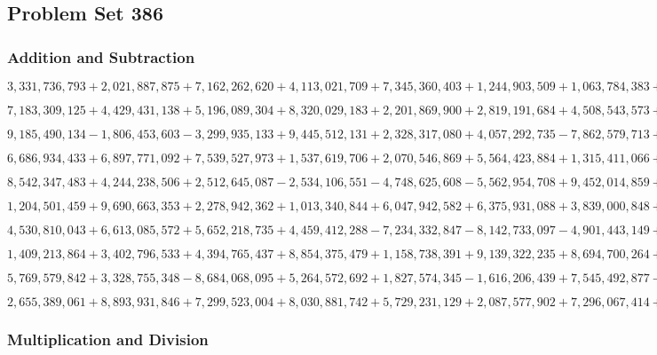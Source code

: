 \hypertarget{problem-set-386}{%
\subsection{Problem Set 386}\label{problem-set-386}}

\hypertarget{addition-and-subtraction}{%
\subsubsection{Addition and
Subtraction}\label{addition-and-subtraction}}

\(3,331,736,793+2,021,887,875+7,162,262,620+4,113,021,709+7,345,360,403+1,244,903,509+1,063,784,383+1,758,860,159+3,834,538,162+9,313,870,804\)

\(7,183,309,125+4,429,431,138+5,196,089,304+8,320,029,183+2,201,869,900+2,819,191,684+4,508,543,573+3,311,459,418+8,317,418,409+1,508,956,166\)

\(9,185,490,134-1,806,453,603-3,299,935,133+9,445,512,131+2,328,317,080+4,057,292,735-7,862,579,713+5,233,473,546-9,817,872,498+6,486,133,917\)

\(6,686,934,433+6,897,771,092+7,539,527,973+1,537,619,706+2,070,546,869+5,564,423,884+1,315,411,066+1,309,236,473+7,487,988,075+3,415,832,471\)

\(8,542,347,483+4,244,238,506+2,512,645,087-2,534,106,551-4,748,625,608-5,562,954,708+9,452,014,859+2,597,101,750+7,622,807,636-5,064,827,252\)

\(1,204,501,459+9,690,663,353+2,278,942,362+1,013,340,844+6,047,942,582+6,375,931,088+3,839,000,848+7,437,264,707+3,150,091,638+6,457,495,442\)

\(4,530,810,043+6,613,085,572+5,652,218,735+4,459,412,288-7,234,332,847-8,142,733,097-4,901,443,149+6,834,464,106+8,208,292,579-5,421,427,099\)

\(1,409,213,864+3,402,796,533+4,394,765,437+8,854,375,479+1,158,738,391+9,139,322,235+8,694,700,264+7,927,816,331+4,275,081,250+9,042,328,943\)

\(5,769,579,842+3,328,755,348-8,684,068,095+5,264,572,692+1,827,574,345-1,616,206,439+7,545,492,877-4,700,157,282+9,461,278,886-9,070,910,969\)

\(2,655,389,061+8,893,931,846+7,299,523,004+8,030,881,742+5,729,231,129+2,087,577,902+7,296,067,414+5,534,394,584+8,191,667,786+2,364,808,771\)

\hypertarget{multiplication-and-division}{%
\subsubsection{Multiplication and
Division}\label{multiplication-and-division}}

